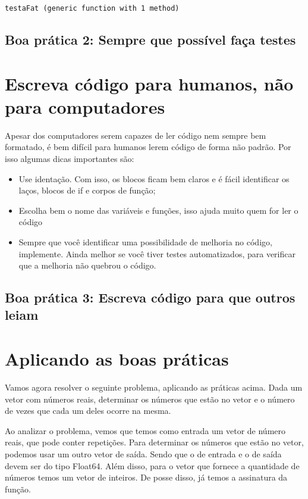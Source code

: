 \documentclass[
  letterpaper,
  DIV=11,
  numbers=noendperiod]{scrreprt}
\begin{document}
\begin{verbatim}
testaFat (generic function with 1 method)
\end{verbatim}

\subsection{Boa prática 2: Sempre que possível faça
testes}\label{boa-pruxe1tica-2-sempre-que-possuxedvel-fauxe7a-testes}

\section{Escreva código para humanos, não para
computadores}\label{escreva-cuxf3digo-para-humanos-nuxe3o-para-computadores}

Apesar dos computadores serem capazes de ler código nem sempre bem
formatado, é bem difícil para humanos lerem código de forma não padrão.
Por isso algumas dicas importantes são:

\begin{itemize}
\item
  Use identação. Com isso, os blocos ficam bem claros e é fácil
  identificar os laços, blocos de if e corpos de função;
\item
  Escolha bem o nome das variáveis e funções, isso ajuda muito quem for
  ler o código
\item
  Sempre que você identificar uma possibilidade de melhoria no código,
  implemente. Ainda melhor se você tiver testes automatizados, para
  verificar que a melhoria não quebrou o código.
\end{itemize}

\subsection{Boa prática 3: Escreva código para que outros
leiam}\label{boa-pruxe1tica-3-escreva-cuxf3digo-para-que-outros-leiam}

\section{Aplicando as boas
práticas}\label{aplicando-as-boas-pruxe1ticas}

Vamos agora resolver o seguinte problema, aplicando as práticas acima.
Dada um vetor com números reais, determinar os números que estão no
vetor e o número de vezes que cada um deles ocorre na mesma.

Ao analizar o problema, vemos que temos como entrada um vetor de número
reais, que pode conter repetições. Para determinar os números que estão
no vetor, podemos usar um outro vetor de saída. Sendo que o de entrada e
o de saída devem ser do tipo Float64. Além disso, para o vetor que
fornece a quantidade de números temos um vetor de inteiros. De posse
disso, já temos a assinatura da função.
\end{document}
